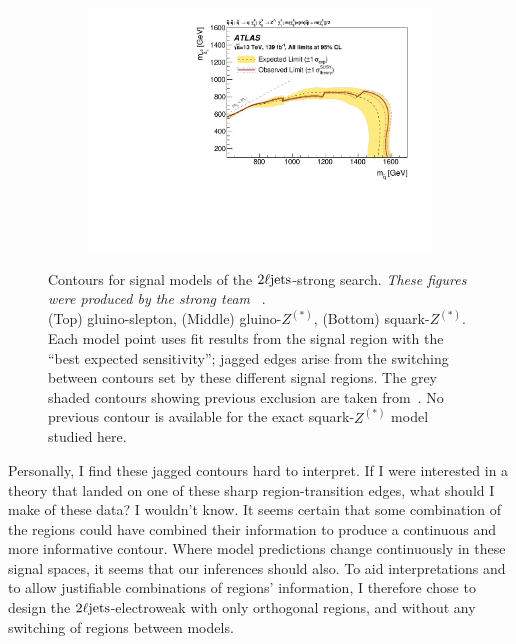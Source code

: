 \begin{figure}[tp]
\begin{subfigure}{0.62\textwidth}
\includegraphics[width=\textwidth]{figures/2ljets_strong_contours_squark_z.pdf}
\end{subfigure}
\caption[
Contours for signal models of the $\twoljets$-strong search
]{%
Contours for signal models of the $\twoljets$-strong search.
\emph{These figures were produced by the strong team%
}~\cite{atlas2022searches}.
\\[0.5em]
(Top) gluino-slepton,
(Middle) gluino-$Z^{(*)}$,
(Bottom) squark-$Z^{(*)}$.
\\
Each model point uses fit results from the signal region with the
``best expected sensitivity'';
jagged edges arise from the switching between contours set by these different
signal regions.
The grey shaded contours showing previous exclusion are taken
from~\cite{atlas_susy_strong_2l_partial_run2}.
No previous contour is available for the exact squark-$Z^{(*)}$ model studied
here.
}
\label{fig:2ljets_strong_contours}
\end{figure}

Personally, I find these jagged contours hard to interpret.
If I were interested in a theory that landed on one of these sharp
region-transition edges, what should I make of these data?
I wouldn't know.
It seems certain that some combination of the regions could have combined their
information to produce a continuous and more informative contour.
Where model predictions change continuously in these signal spaces, it seems
that our inferences should also.
To aid interpretations and to allow justifiable combinations of regions'
information, I therefore chose to design the $\twoljets$-electroweak with only
orthogonal regions, and without any switching of regions between models.


